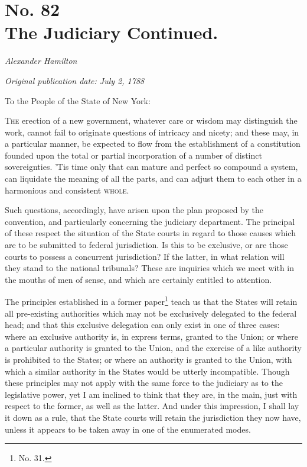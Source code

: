 \chapter[No. 82: The Judiciary Continued.]{No. 82\\ {\small The Judiciary Continued.}}

\textit{Alexander Hamilton}

\textit{Original publication date: July 2, 1788}
\vspace{1cm}

To the People of the State of New York:
\vspace{.4cm}

\textsc{The} erection of a new government, whatever care or wisdom may distinguish the work, cannot fail to originate questions of intricacy and nicety; and these may, in a particular manner, be expected to flow from the establishment of a constitution founded upon the total or partial incorporation of a number of distinct sovereignties. 
'Tis time only that can mature and perfect so compound a system, can liquidate the meaning of all the parts, and can adjust them to each other in a harmonious and consistent \textsc{whole}.

Such questions, accordingly, have arisen upon the plan proposed by the convention, and particularly concerning the judiciary department. 
The principal of these respect the situation of the State courts in regard to those causes which are to be submitted to federal jurisdiction. 
Is this to be exclusive, or are those courts to possess a concurrent jurisdiction? 
If the latter, in what relation will they stand to the national tribunals? 
These are inquiries which we meet with in the mouths of men of sense, and which are certainly entitled to attention.

The principles established in a former paper\footnote{No. 
31.} teach us that the States will retain all pre-existing authorities which may not be exclusively delegated to the federal head; and that this exclusive delegation can only exist in one of three cases: where an exclusive authority is, in express terms, granted to the Union; or where a particular authority is granted to the Union, and the exercise of a like authority is prohibited to the States; or where an authority is granted to the Union, with which a similar authority in the States would be utterly incompatible. 
Though these principles may not apply with the same force to the judiciary as to the legislative power, yet I am inclined to think that they are, in the main, just with respect to the former, as well as the latter. 
And under this impression, I shall lay it down as a rule, that the State courts will retain the jurisdiction they now have, unless it appears to be taken away in one of the enumerated modes.

